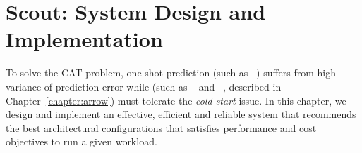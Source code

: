 \chapter{Scout: System Design and Implementation}
\label{chapter:scout}

To solve the CAT problem,
one-shot prediction (such as \paris~\cite{Yadwadkar2017}) suffers from
high variance of prediction error
while \bo (such as \cherrypick~\cite{Alipourfard2017} and \arrow~\cite{Hsu2018Arrow},
described in Chapter~\ref{chapter:arrow}) must
tolerate the \emph{cold-start} issue.
In this chapter, we design and implement an
effective, efficient and reliable system that recommends
the best architectural configurations 
that satisfies performance and cost objectives
to run a given workload.



%






